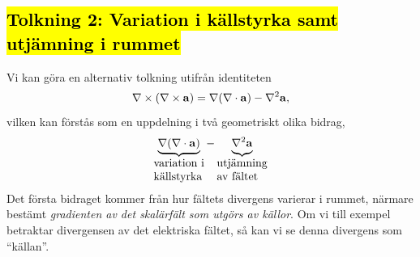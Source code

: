 \subsection{{\hl{Tolkning 2: Variation i k{\"a}llstyrka samt utj{\"a}mning
  i rummet}}}
Vi kan g{\"o}ra en alternativ tolkning utifr{\aa}n identiteten
$$
  \nabla\times(\nabla\times{\bf a})=\nabla(\nabla\cdot{\bf a})-\nabla^2{\bf a},
$$
vilken kan f{\"o}rst{\aa}s som en uppdelning i tv{\aa} geometriskt olika bidrag,
$$
  \underbrace{
    \nabla(\nabla\cdot{\bf a})
  }_{
    \vbox{
      \hbox{variation i}
      \hbox{k{\"a}llstyrka}
    }
  }
  -
  \underbrace{
    \vphantom{\nabla(\nabla\cdot{\bf a})}
    \nabla^2{\bf a}
  }_{
    \vbox{
      \hbox{utj{\"a}mning}
      \hbox{av f{\"a}ltet}
    }
  }
$$
Det f{\"o}rsta bidraget kommer fr{\aa}n hur f{\"a}ltets divergens varierar i
rummet, n{\"a}rmare best{\"a}mt {\it gradienten av det skal{\"a}rf{\"a}lt som
utg{\"o}rs av k{\"a}llor}. Om vi till exempel betraktar divergensen av det
elektriska f{\"a}ltet, s{\aa} kan vi se denna divergens som ``k{\"a}llan''.

